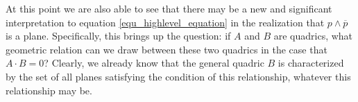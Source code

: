 \documentclass{ecgd-l}
\theoremstyle{definition}
\theoremstyle{remark}
\numberwithin{equation}{section}
\begin{document}
At this point we are also able to see that there may be a new
and significant interpretation to equation \eqref{equ_highlevel_equation}
in the realization that $p\wedge\overline{p}$ is a plane.  Specifically,
this brings up the question: if $A$ and $B$ are quadrics, what geometric
relation can we draw between these two quadrics in the case that
$A\cdot B=0$?  Clearly, we already know that the general
quadric $B$ is characterized by the set of all planes satisfying
the condition of this relationship, whatever this relationship may be.







\end{document}
